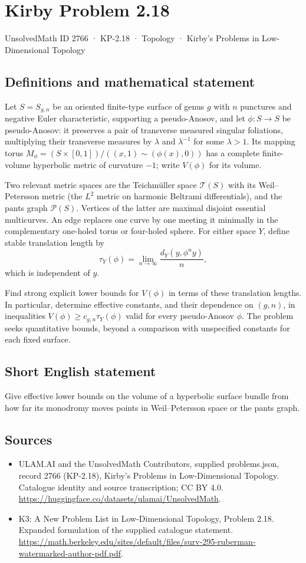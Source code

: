 \documentclass[11pt,a4paper]{article}
\begin{document}
\section*{Kirby Problem 2.18}\label{2766}
{\small UnsolvedMath ID 2766 · KP-2.18 · Topology · Kirby's Problems in Low-Dimensional Topology}
\subsection{Definitions and mathematical statement}
Let $S=S_{g,n}$ be an oriented finite-type surface of genus $g$ with $n$
punctures and negative Euler characteristic, supporting a pseudo-Anosov, and let
$\phi:S\to S$ be pseudo-Anosov: it preserves a pair of transverse measured
singular foliations, multiplying their transverse measures by $\lambda$ and
$\lambda^{-1}$ for some $\lambda>1$. Its mapping torus
$M_\phi=(S\times[0,1])/((x,1)\sim(\phi(x),0))$ has a complete finite-volume
hyperbolic metric of curvature $-1$; write $V(\phi)$ for its volume.

Two relevant metric spaces are the Teichmüller space $\mathcal T(S)$ with its
Weil--Petersson metric (the $L^2$ metric on harmonic Beltrami differentials),
and the pants graph $\mathcal P(S)$. Vertices of the latter are maximal
disjoint essential multicurves. An edge replaces one curve by one meeting it
minimally in the complementary one-holed torus or four-holed sphere.
For either space $Y$, define stable translation length by
\[
 \tau_Y(\phi)=\lim_{n\to\infty}\frac{d_Y(y,\phi^n y)}n,
\]
which is independent of $y$.

Find strong explicit lower bounds for $V(\phi)$ in terms of these translation
lengths. In particular, determine effective constants, and their dependence
on $(g,n)$, in inequalities $V(\phi)\geq c_{g,n}\tau_Y(\phi)$ valid for every
pseudo-Anosov $\phi$. The problem seeks quantitative bounds, beyond a
comparison with unspecified constants for each fixed surface.
\subsection{Short English statement}
Give effective lower bounds on the volume of a hyperbolic surface bundle from how far its monodromy moves points in Weil--Petersson space or the pants graph.
\subsection{Sources}
\begin{itemize}
\item[S1] ULAM.AI and the UnsolvedMath Contributors, supplied problems.json, record 2766 (KP-2.18), Kirby's Problems in Low-Dimensional Topology. Catalogue identity and source transcription; CC BY 4.0.
\url{https://huggingface.co/datasets/ulamai/UnsolvedMath}.
\item[S2] K3: A New Problem List in Low-Dimensional Topology, Problem 2.18. Expanded formulation of the supplied catalogue statement.
\url{https://math.berkeley.edu/sites/default/files/surv-295-ruberman-watermarked-author-pdf.pdf}.
\end{itemize}
\end{document}
